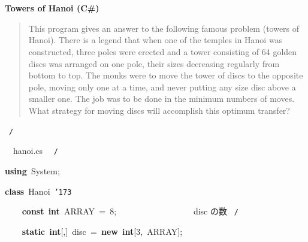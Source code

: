 \documentclass[a4paper,10pt]{article}
\def\mc{\relax}
\begin{document}
\tt\mc 

\noindent
\mbox{}\rm\mc {\tt /}{\tt *}\  \hrulefill *
\tt\mc 

\noindent
\mbox{}\hfill

\noindent
\mbox{}\rm\mc \ %

\centerline{\bf Towers of Hanoi (C\#)}

\begin{quote}

This program gives an answer to the following famous problem (towers of
Hanoi).
There is a legend that when one of the temples in Hanoi was constructed,
three poles were erected and a tower consisting of 64 golden discs was
arranged on one pole, their sizes decreasing regularly from bottom to top.
The monks were to move the tower of discs to the opposite pole, moving
only one at a time, and never putting any size disc above a smaller one.
The job was to be done in the minimum numbers of moves. What strategy for
moving discs will accomplish this optimum transfer?
\end{quote}

\tt\mc 

\noindent
\mbox{}\hfill

\noindent
\mbox{}\rm\mc {\tt *} \hrulefill \rm\mc \ {\tt *}{\tt /}
\tt\mc 

\noindent
\mbox{}\hfill

\noindent
\mbox{}\rm\mc {\tt /}{\tt *}\  \hrulefill\ hanoi.cs \ \hrulefill \rm\mc \ {\tt *}{\tt /}
\tt\mc 

\noindent
\mbox{}\hfill

\noindent
\mbox{}\textbf{using}{\tt\mc \ }System;

\noindent
\mbox{}\hfill

\noindent
\mbox{}\textbf{class}{\tt\mc \ }Hanoi{\tt\mc \ }{\tt\char'173}

\noindent
\mbox{}{\tt\mc \ }{\tt\mc \ }{\tt\mc \ }{\tt\mc \ }\textbf{const}{\tt\mc \ }\textbf{int}{\tt\mc \ }ARRAY{\tt\mc \ }={\tt\mc \ }8;{\tt\mc \ }{\tt\mc \ }{\tt\mc \ }{\tt\mc \ }{\tt\mc \ }{\tt\mc \ }{\tt\mc \ }{\tt\mc \ }{\tt\mc \ }{\tt\mc \ }{\tt\mc \ }{\tt\mc \ }{\tt\mc \ }{\tt\mc \ }{\tt\mc \ }{\tt\mc \ }\rm\mc {\tt /}{\tt *}\  \ disc の数 \hfill \rm\mc \ {\tt *}{\tt /}
\tt\mc 

\noindent
\mbox{}\hfill

\noindent
\mbox{}{\tt\mc \ }{\tt\mc \ }{\tt\mc \ }{\tt\mc \ }\textbf{static}{\tt\mc \ }\textbf{int}[,]{\tt\mc \ }disc{\tt\mc \ }={\tt\mc \ }\textbf{new}{\tt\mc \ }\textbf{int}[3,{\tt\mc \ }ARRAY];
\end{document}

